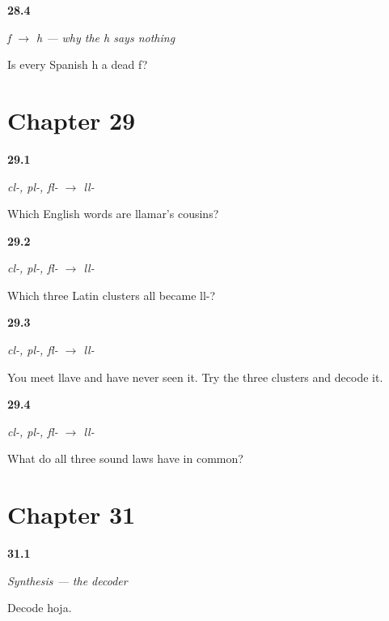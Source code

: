 \noindent\begin{minipage}[t]{\linewidth}
\raggedright
\hypertarget{review-ES-C57-f-a-h-limit}{\textbf{28.4}} \emph{f $\to$ h — why the h says nothing}\par
\small Is every Spanish h a dead f?
\end{minipage}\par\medskip

\section*{Chapter 29}

\noindent\begin{minipage}[t]{\linewidth}
\raggedright
\hypertarget{review-ES-C57-ll-claim}{\textbf{29.1}} \emph{cl-, pl-, fl- $\to$ ll-}\par
\small Which English words are llamar's cousins?
\end{minipage}\par\medskip

\noindent\begin{minipage}[t]{\linewidth}
\raggedright
\hypertarget{review-ES-C57-ll-three}{\textbf{29.2}} \emph{cl-, pl-, fl- $\to$ ll-}\par
\small Which three Latin clusters all became ll-?
\end{minipage}\par\medskip

\noindent\begin{minipage}[t]{\linewidth}
\raggedright
\hypertarget{review-ES-C57-ll-decode}{\textbf{29.3}} \emph{cl-, pl-, fl- $\to$ ll-}\par
\small You meet llave and have never seen it. Try the three clusters and decode it.
\end{minipage}\par\medskip

\noindent\begin{minipage}[t]{\linewidth}
\raggedright
\hypertarget{review-ES-C57-ll-shape}{\textbf{29.4}} \emph{cl-, pl-, fl- $\to$ ll-}\par
\small What do all three sound laws have in common?
\end{minipage}\par\medskip

\section*{Chapter 31}

\noindent\begin{minipage}[t]{\linewidth}
\raggedright
\hypertarget{review-ES-C57-sintesis-descifrar-h}{\textbf{31.1}} \emph{Synthesis — the decoder}\par
\small Decode hoja.
\end{minipage}\par\medskip

